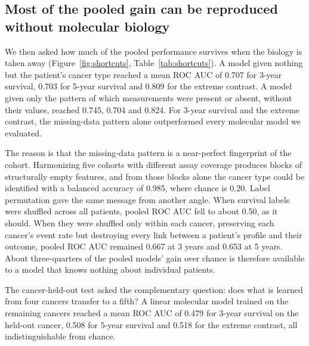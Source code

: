 \documentclass[11pt, a4paper, onecolumn, confidential, copyright]{hawkfranklin}
\begin{document}
\begin{table}[ht]
\centering
\caption{Mean ROC AUC across frozen test sets. Within-cancer is the macro-average over the cancer-specific tasks. NA, pooled 3-year training sets exceeded the 1,000-sample CPU limit of TabPFN v2--v2.6 and were not evaluated.}
\label{tab:model_auc}
\resizebox{\linewidth}{!}{}
\end{table}

\subsection{Most of the pooled gain can be reproduced without molecular biology}

We then asked how much of the pooled performance survives when the biology is taken away (Figure~\ref{fig:shortcuts}, Table~\ref{tab:shortcuts}). A model given nothing but the patient's cancer type reached a mean ROC AUC of 0.707 for 3-year survival, 0.703 for 5-year survival and 0.809 for the extreme contrast. A model given only the pattern of which measurements were present or absent, without their values, reached 0.745, 0.704 and 0.824. For 3-year survival and the extreme contrast, the missing-data pattern alone outperformed every molecular model we evaluated.

The reason is that the missing-data pattern is a near-perfect fingerprint of the cohort. Harmonizing five cohorts with different assay coverage produces blocks of structurally empty features, and from those blocks alone the cancer type could be identified with a balanced accuracy of 0.985, where chance is 0.20. Label permutation gave the same message from another angle. When survival labels were shuffled across all patients, pooled ROC AUC fell to about 0.50, as it should. When they were shuffled only within each cancer, preserving each cancer's event rate but destroying every link between a patient's profile and their outcome, pooled ROC AUC remained 0.667 at 3 years and 0.653 at 5 years. About three-quarters of the pooled models' gain over chance is therefore available to a model that knows nothing about individual patients.

The cancer-held-out test asked the complementary question: does what is learned from four cancers transfer to a fifth? A linear molecular model trained on the remaining cancers reached a mean ROC AUC of 0.479 for 3-year survival on the held-out cancer, 0.508 for 5-year survival and 0.518 for the extreme contrast, all indistinguishable from chance.
\end{document}
